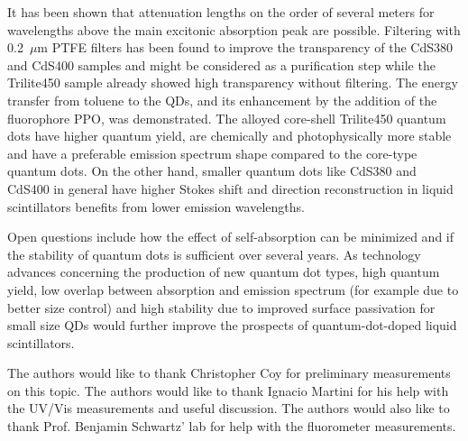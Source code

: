 \documentclass[cits]{JINST}
\begin{document}
It has been shown that attenuation lengths on the order of several meters for wavelengths above the main excitonic absorption peak are possible. Filtering with 0.2~$\mu$m PTFE filters has been found to improve the transparency of the CdS380 and CdS400 samples and might be considered as a purification step while the Trilite450 sample already showed high transparency without filtering. The energy transfer from toluene to the QDs, and its enhancement by the addition of the fluorophore PPO, was demonstrated. The alloyed core-shell Trilite450 quantum dots have higher quantum yield, are chemically and photophysically more stable and have a preferable emission spectrum shape compared to the core-type quantum dots. On the other hand, smaller quantum dots like CdS380 and CdS400 in general have higher Stokes shift and direction reconstruction in liquid scintillators benefits from lower emission wavelengths. 

Open questions include how the effect of self-absorption can be minimized and if the stability of quantum dots is sufficient over several years. As technology advances concerning the production of new quantum dot types, high quantum yield, low overlap between absorption and emission spectrum (for example due to better size control) and high stability due to improved surface passivation for small size QDs would further improve the prospects of quantum-dot-doped liquid scintillators.

\acknowledgments
The authors would like to thank Christopher Coy for preliminary measurements on this topic. The authors would like to thank Ignacio Martini for his help with the UV/Vis measurements and useful discussion. The authors would also like to thank Prof. Benjamin Schwartz' lab for help with the fluorometer measurements.
\end{document}
